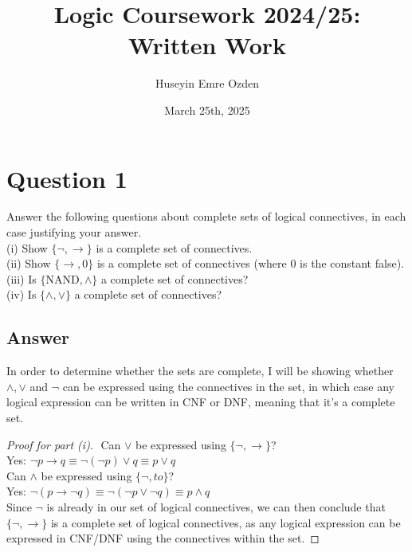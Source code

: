 \documentclass[12pt]{fphw}
\title{Logic Coursework 2024/25: Written Work}
\author{Huseyin Emre Ozden}
\date{March 25th, 2025}
\institute{Durham University}
\begin{document}
\maketitle

\section*{Question 1}

\begin{problem}
  Answer the following questions about complete sets of logical connectives, in each case justifying your answer. \\
  (i) Show $\{\neg, \to \}$ is a complete set of connectives. \\
  (ii) Show $\{\to, 0\}$ is a complete set of connectives (where $0$ is the constant false). \\
  (iii) Is $\{ \text{NAND}, \wedge\}$ a complete set of connectives? \\
  (iv) Is $\{\wedge, \vee\}$ a complete set of connectives?
\end{problem}

\subsection*{Answer}

In order to determine whether the sets are complete, I will be showing whether $\wedge, \vee$ and $\neg$ can be expressed using the connectives in the set, in which case any logical expression can be written in CNF or DNF, meaning that it's a complete set.

\begin{proof}[Proof for part (i)] $ $ \newline
  Can $\vee$ be expressed using $\{\neg, \to \}$? \\
  Yes: $\neg p \to q \equiv \neg(\neg p) \vee q \equiv p \vee q$ \\
  Can $\wedge$ be expressed using $\{\neg, to \}$? \\
  Yes: $\neg(p \to \neg q) \equiv \neg (\neg p \vee \neg q) \equiv p \wedge q$ \\
  Since $\neg$ is already in our set of logical connectives, we can then conclude that $\{\neg, \to \}$ is a complete set of logical connectives, as any logical expression can be expressed in CNF/DNF using the connectives within the set.
\end{proof}
\end{document}
